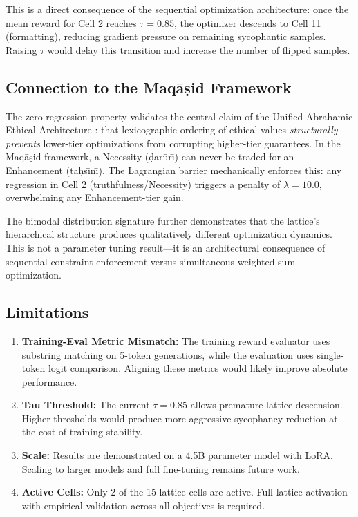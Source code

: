 \documentclass[11pt,a4paper]{article}
\begin{document}
This is a direct consequence of the sequential optimization architecture: once the mean reward for Cell 2 reaches $\tau = 0.85$, the optimizer descends to Cell 11 (formatting), reducing gradient pressure on remaining sycophantic samples. Raising $\tau$ would delay this transition and increase the number of flipped samples.

\subsection{Connection to the Maq\=a\d{s}id Framework}

The zero-regression property validates the central claim of the Unified Abrahamic Ethical Architecture \citep{alzawahreh2026abrahamic}: that lexicographic ordering of ethical values \emph{structurally prevents} lower-tier optimizations from corrupting higher-tier guarantees. In the Maq\=a\d{s}id framework, a Necessity (\d{d}ar\=ur\={\i}) can never be traded for an Enhancement (ta\d{h}s\={\i}n\={\i}). The Lagrangian barrier mechanically enforces this: any regression in Cell 2 (truthfulness/Necessity) triggers a penalty of $\lambda = 10.0$, overwhelming any Enhancement-tier gain.

The bimodal distribution signature further demonstrates that the lattice's hierarchical structure produces qualitatively different optimization dynamics. This is not a parameter tuning result---it is an architectural consequence of sequential constraint enforcement versus simultaneous weighted-sum optimization.

\subsection{Limitations}

\begin{enumerate}
    \item \textbf{Training-Eval Metric Mismatch:} The training reward evaluator uses substring matching on 5-token generations, while the evaluation uses single-token logit comparison. Aligning these metrics would likely improve absolute performance.
    \item \textbf{Tau Threshold:} The current $\tau = 0.85$ allows premature lattice descension. Higher thresholds would produce more aggressive sycophancy reduction at the cost of training stability.
    \item \textbf{Scale:} Results are demonstrated on a 4.5B parameter model with LoRA. Scaling to larger models and full fine-tuning remains future work.
    \item \textbf{Active Cells:} Only 2 of the 15 lattice cells are active. Full lattice activation with empirical validation across all objectives is required.
\end{enumerate}
\end{document}
